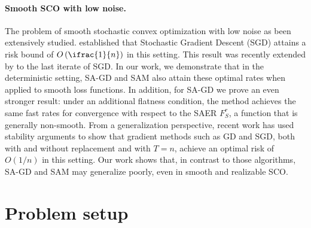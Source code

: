 \documentclass[11pt]{article}
\newcommand{\fsmax}{F_S^{\rad}}
\newcommand{\rad}{r}
\begin{document}
\paragraph{Smooth SCO with low noise.}
The problem of smooth stochastic convex optimization with low noise as been extensively studied. \cite{srebro2010smoothness} established that Stochastic Gradient Descent (SGD) attains a risk bound of $O\left(\ifrac{1}{n}\right)$ in this setting. This result was recently extended by \cite{attia2025fast} to the last iterate of SGD. 
In our work, we demonstrate that in the deterministic setting, SA-GD and SAM also attain these optimal rates when applied to smooth loss functions. In addition, for SA-GD we prove an even stronger result: under an additional flatness condition, the method achieves the same fast rates for convergence with respect to the SAER $\fsmax$, a function that is generally non-smooth.
From a generalization perspective, recent work \citep{lei2020fine, nikolakakis2022beyond, schliserman22a, evron2025better, attia2025fast} has used stability arguments to show that gradient methods such as GD and SGD, both with and without replacement and with $T=n$, achieve an optimal risk of $O(1/n)$ in this setting. Our work shows that, in contrast to those algorithms, SA-GD and SAM may generalize poorly, even in smooth and realizable SCO.








\section{Problem setup}
\end{document}
